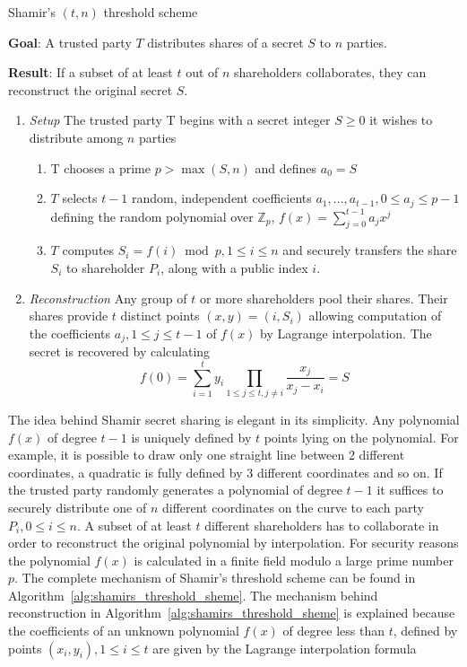 \begin{algorithm}
\caption{Shamir's $\left( t, n \right)$ threshold scheme~\cite{book:handbook_of_applied_cryptography} }
\label{alg:shamirs_threshold_sheme}
 \textbf{Goal}: A trusted party $T$ distributes shares of a secret $S$ to $n$ parties.
 
 \textbf{Result}: If a subset of at least $t$ out of $n$ shareholders collaborates, they can reconstruct the original secret $S$.
 \begin{enumerate}
  \item \textit{Setup} The trusted party T begins with a secret integer $S \geq 0$ it wishes to distribute among $n$ parties
   \begin{enumerate}
    \item T chooses a prime $p > \max \left( S, n \right)$ and defines $a_0 = S$
    \item $T$ selects $t-1$ random, independent coefficients $a_1, \ldots, a_{t-1}, 0 \leq a_j \leq p-1$ defining the random polynomial over $\mathbb{Z}_p$, $f \left( x \right) = \sum^{t-1}_{j=0} a_j x^j$
    \item $T$ computes $S_i = f \left( i \right) \bmod p, 1 \leq i \leq n$ and securely transfers the share $S_i$ to shareholder $P_i$, along with a public index $i$.
   \end{enumerate}
   \item \textit{Reconstruction} Any group of $t$ or more shareholders pool their shares. Their shares provide $t$ distinct points $\left( x, y \right) = \left( i, S_i \right)$ allowing computation of the coefficients $a_j, 1 \leq j \leq t-1$ of $f \left( x \right)$ by Lagrange interpolation. The secret is recovered by calculating
 \begin{equation*}
  f \left( 0 \right) = \sum^t_{i=1}y_i \prod_{1 \leq j \leq t, j \neq i} \frac{x_j}{x_j-x_i} = S
 \end{equation*}
 \end{enumerate}
\end{algorithm}

The idea behind Shamir secret sharing is elegant in its simplicity. Any polynomial $f \left( x \right)$ of degree $t-1$ is uniquely defined by $t$ points lying on the polynomial. For example, it is possible to draw only one straight line between 2 different coordinates, a quadratic is fully defined by 3 different coordinates and so on. If the trusted party randomly generates a polynomial of degree $t-1$ it suffices to securely distribute one of $n$ different coordinates on the curve to each party $P_i, 0 \leq i \leq n$. A subset of at least $t$ different shareholders has to collaborate in order to reconstruct the original polynomial by interpolation. For security reasons the polynomial $f \left( x \right)$ is calculated in a finite field modulo a large prime number $p$. The complete mechanism of Shamir's threshold scheme can be found in Algorithm~\ref{alg:shamirs_threshold_sheme}. The mechanism behind reconstruction in Algorithm~\ref{alg:shamirs_threshold_sheme} is explained because the coefficients of an unknown polynomial $f \left( x \right)$ of degree less than $t$, defined by points $\left( x_i, y_i \right), 1 \leq i \leq t$ are given by the Lagrange interpolation formula

